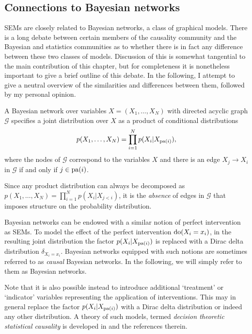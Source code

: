 \subsection{Connections to Bayesian networks}

SEMs are closely related to Bayesian networks, a class of graphical models.
There is a long debate between certain members of the causality community and the Bayesian and statistics communities as to whether there is in fact any difference between these two classes of models.
Discussion of this is somewhat tangential to the main contribution of this chapter, but for completeness it is nonetheless important to give a brief outline of this debate.
In the following, I attempt to give a neutral overview of the similarities and differences between them, followed by my personal opinion.


\medskip

\begin{definition}
A Bayesian network over variables $X = (X_1,\ldots, X_N)$ with directed acyclic graph $\mathcal{G}$ specifies a joint distribution over $X$ as a product of conditional distributions
\begin{align*}
	p(X_1,\ldots,X_N) = \prod_{i=1}^N p(X_i | X_{\operatorname{pa}(i)}),
\end{align*}
where the nodes of $\mathcal{G}$ correspond to the variables $X$ and there is an edge $X_j \to X_i$ in $\mathcal{G}$ if and only if $j \in \operatorname{pa}(i)$.
\end{definition}

Since any product distribution can always be decomposed as $p(X_1,\ldots,X_N) = \prod_{i=1}^N p(X_i | X_{j<i})$, it is the \emph{absence} of edges in $\mathcal{G}$ that imposes structure on the probability distribution.

Bayesian networks can be endowed with a similar notion of perfect intervention as SEMs. To model the effect of the perfect intervention $\operatorname{do}(X_i = x_i)$, in the resulting joint distribution the factor $p(X_i | X_{\operatorname{pa}(i)})$ is replaced with a Dirac delta distribution $\delta_{X_i = x_i}$.
Bayesian networks equipped with such notions are sometimes referred to as \emph{causal} Bayesian networks. 
In the following, we will simply refer to them as Bayesian networks.

Note that it is also possible instead to introduce additional `treatment' or `indicator' variables representing the application of interventions. This may in general replace the factor $p(X_i | X_{\operatorname{pa}(i)})$ with a Dirac delta distribution or indeed any other distribution.
A theory of such models, termed \emph{decision theoretic statistical causality} is developed in \cite{dawid2020decision} and the references therein.


